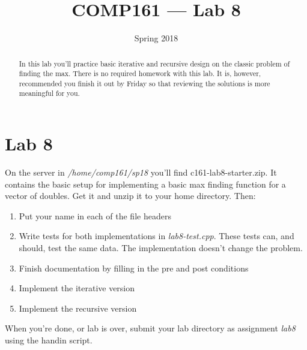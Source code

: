 \documentclass[nobib]{tufte-handout}
\title{COMP161 --- Lab 8}
\author{}
\date{Spring 2018}
\begin{document}
\maketitle

\begin{abstract}
In this lab you'll practice basic iterative and recursive design on the classic problem of finding the max. There is no required homework with this lab. It is, however, recommended you finish it out by Friday so that reviewing the solutions is more meaningful for you.
\end{abstract}

\section{Lab 8}

On the server in \textit{/home/comp161/sp18} you'll find c161-lab8-starter.zip. It contains the basic setup for implementing a basic max finding function for a vector of doubles. Get it and unzip it to your home directory. Then:
\begin{enumerate}
\item Put your name in each of the file headers
\item Write tests for both implementations in \textit{lab8-test.cpp}.  These tests can, and should, test the same data. The implementation doesn't change the problem.
\item Finish documentation by filling in the pre and post conditions
\item Implement the iterative version
\item Implement the recursive version
\end{enumerate}

When you're done, or lab is over, submit your lab directory as assignment \textit{lab8} using the handin script.
\end{document}
